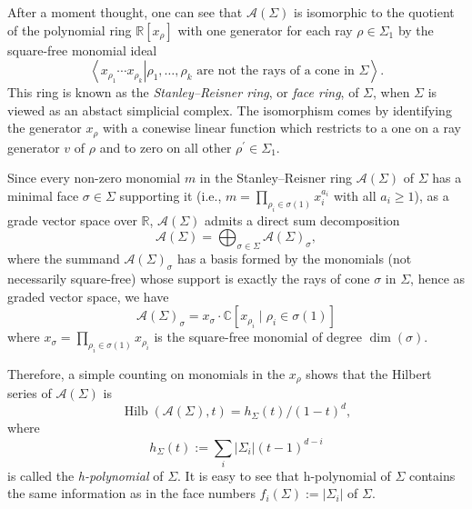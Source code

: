 \documentclass{amsart}
\theoremstyle{definition}
\theoremstyle{remark}
\numberwithin{equation}{section}
\begin{document}
After a moment thought, one can see that $\mathcal{A}(\Sigma)$ is isomorphic to the quotient of the polynomial ring $\mathbb{R}\left[x_\rho\right]$ with one generator for each ray $\rho \in \Sigma_1$ by the square-free monomial ideal
$$
\left.\left\langle x_{\rho_1} \cdots x_{\rho_k}\right| \rho_1, \ldots, \rho_k \text { are not the rays of a cone in } \Sigma\right\rangle.
$$
This ring is known as the \emph{Stanley--Reisner ring}, or \emph{face ring}, of $\Sigma$, when $\Sigma$  is viewed as an abstact simplicial complex. The isomorphism comes by identifying the generator $x_\rho$ with a conewise linear function which restricts to a one on a ray generator $v$ of $\rho$ and to zero on all other $\rho^{\prime} \in \Sigma_1$. 

Since every non-zero monomial $m$ in the Stanley--Reisner ring $\mathcal{A}(\Sigma)$ of $\Sigma$ has a minimal face $\sigma \in \Sigma$ supporting it (i.e., $m = \prod_{\rho_i \in \sigma(1)} x_i^{a_i}$ with all $a_i \ge 1$), as a grade vector space over $\mathbb{R}$, $\mathcal{A}(\Sigma)$ admits a direct sum decomposition
\begin{equation} \label{eq-decom of SR}
   \mathcal{A}(\Sigma)=\bigoplus_{\sigma \in \Sigma} \mathcal{A}(\Sigma)_\sigma, 
\end{equation}
where the summand $\mathcal{A}(\Sigma)_\sigma$ has a basis formed by the monomials (not necessarily square-free) whose support is exactly the rays of cone $\sigma$ in $\Sigma$, hence as graded vector space, we have
\begin{equation} \label{eq-summand of SR}
\mathcal{A}(\Sigma)_\sigma=x_\sigma \cdot \mathbb{C}[x_{\rho_i} \mid \rho_i \in \sigma(1)]
\end{equation}
where $x_\sigma = \prod_{\rho_i \in \sigma(1)} x_{\rho_i}$ is the square-free monomial of degree $\dim(\sigma)$.

Therefore, a simple counting on monomials in the $x_\rho$ shows that the Hilbert series of $\mathcal{A}(\Sigma)$ is
$$
\operatorname{Hilb}(\mathcal{A}(\Sigma), t)=h_\Sigma( t)/(1-t)^d,
$$
where 
\begin{equation} \label{eq-h-poly}
h_\Sigma( t):=\sum_i\left|\Sigma_i\right|(t-1)^{d-i}
\end{equation}
is called the \emph{h-polynomial} of $\Sigma$. It is easy to see that h-polynomial of $\Sigma$ contains the same information as in the face numbers $f_i(\Sigma):=\left|\Sigma_i\right|$ of $\Sigma$.
\end{document}
